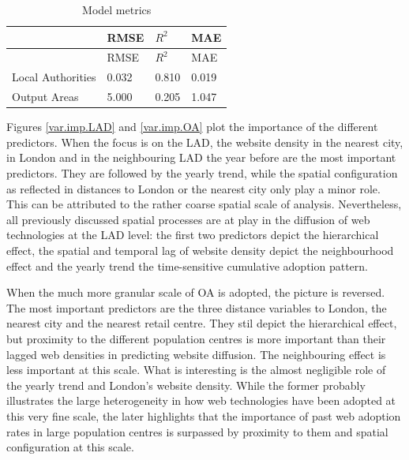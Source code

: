 \documentclass[
  authoryear,
  preprint,
  3p]{elsarticle}
\begin{document}
\begin{longtable}[]{@{}llll@{}}
\caption{Model metrics}\label{tbl-model-metrics}\tabularnewline
\toprule\noalign{}
& RMSE & \(R^{2}\) & MAE \\
\midrule\noalign{}
\endfirsthead
\toprule\noalign{}
& RMSE & \(R^{2}\) & MAE \\
\midrule\noalign{}
\endhead
\bottomrule\noalign{}
\endlastfoot
Local Authorities & 0.032 & 0.810 & 0.019 \\
Output Areas & 5.000 & 0.205 & 1.047 \\
\end{longtable}

Figures \ref{var.imp.LAD} and \ref{var.imp.OA} plot the importance of
the different predictors. When the focus is on the LAD, the website
density in the nearest city, in London and in the neighbouring LAD the
year before are the most important predictors. They are followed by the
yearly trend, while the spatial configuration as reflected in distances
to London or the nearest city only play a minor role. This can be
attributed to the rather coarse spatial scale of analysis. Nevertheless,
all previously discussed spatial processes are at play in the diffusion
of web technologies at the LAD level: the first two predictors depict
the hierarchical effect, the spatial and temporal lag of website density
depict the neighbourhood effect and the yearly trend the time-sensitive
cumulative adoption pattern.

When the much more granular scale of OA is adopted, the picture is
reversed. The most important predictors are the three distance variables
to London, the nearest city and the nearest retail centre. They stil
depict the hierarchical effect, but proximity to the different
population centres is more important than their lagged web densities in
predicting website diffusion. The neighbouring effect is less important
at this scale. What is interesting is the almost negligible role of the
yearly trend and London's website density. While the former probably
illustrates the large heterogeneity in how web technologies have been
adopted at this very fine scale, the later highlights that the
importance of past web adoption rates in large population centres is
surpassed by proximity to them and spatial configuration at this scale.
\end{document}
